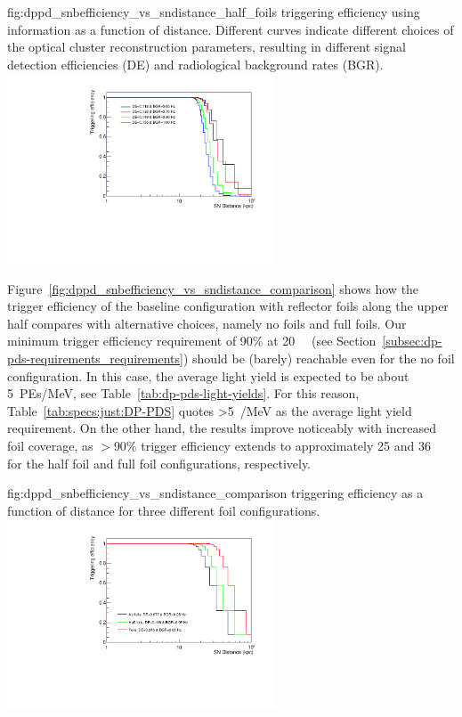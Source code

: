 \begin{dunefigure}{fig:dppd_snbefficiency_vs_sndistance_half_foils}
     { triggering efficiency using   information as a function of  distance. Different curves indicate different choices of the optical cluster reconstruction parameters, resulting in different  \nue signal detection efficiencies (DE) and radiological background rates (BGR).}
    \includegraphics[width=0.6\textwidth]{graphics/dppd_snbefficiency_vs_sndistance_half_foils.pdf}
    \end{dunefigure}

Figure~\ref{fig:dppd_snbefficiency_vs_sndistance_comparison} shows how the  trigger efficiency of the baseline configuration with  reflector foils along the upper  half compares with alternative choices, namely no foils and full foils. Our minimum  trigger efficiency requirement of \num{90}\% at \SI{20}{\kilo\parsec} (see Section~\ref{subsec:dp-pds-requirements_requirements}) should be (barely) reachable even for the no foil configuration. In this case, the average light yield is expected to be about \SI{5}{PEs/MeV}, see Table~\ref{tab:dp-pds-light-yields}. For this reason, Table~\ref{tab:specs:just:DP-PDS} quotes \SI{>5}{/\MeV} as the average light yield requirement. On the other hand, the results improve noticeably with increased foil coverage, as $>$\num{90}\% trigger efficiency extends to approximately \num{25} and \SI{36}{\kilo\parsec} for the half foil and full foil configurations, respectively. 

\begin{dunefigure}{fig:dppd_snbefficiency_vs_sndistance_comparison}
     { triggering efficiency as a function of  distance for three different  foil configurations.}
    \includegraphics[width=0.6\textwidth]{graphics/dppd_snbefficiency_vs_sndistance_comparison.pdf}
    \end{dunefigure}

